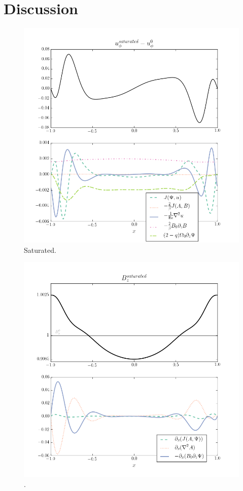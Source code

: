 \documentclass{emulateapj}
\begin{document}
\section{Discussion}
\label{sec:discussion}

\begin{figure}
\centering
\includegraphics[width=\columnwidth]{../figures/thingap_saturation_mechanism_plots_velocity_slice60.png}
\caption{Saturated.}\label{fig:sat_comp_vel}
\end{figure}

\begin{figure}
\centering
\includegraphics[width=\columnwidth]{../figures/thingap_saturation_mechanism_plots_Bfield_slice60.png}
\caption{.}\label{fig:sat_comp_Bfield}
\end{figure}
\end{document}
